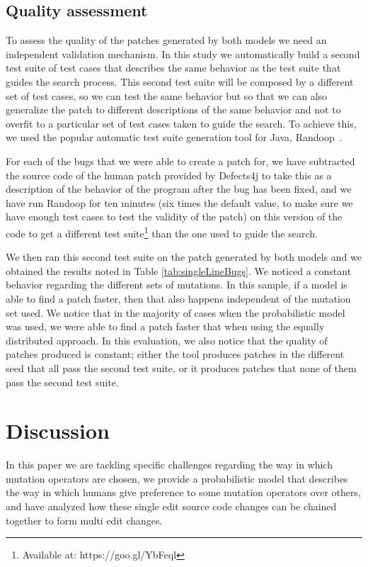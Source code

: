 \documentclass[conference]{IEEEtran}
\begin{document}
\subsection{Quality assessment}
To assess the quality of the patches generated by both models we need an independent validation mechanism. In this study we automatically build a second test suite of test cases that describes the same behavior as the test suite that guides the search process. This second test suite will be composed by a different set of test cases, so we can test the same behavior but so that we can also generalize the patch to different descriptions of the same behavior and not to overfit to a particular set of test cases taken to guide the search. To achieve this, we used the popular automatic test suite generation tool for Java, Randoop~\cite{pacheco07}.

For each of the bugs that we were able to create a patch for, we have subtracted the source code of the human patch provided by Defects4j to take this as a description of the behavior of the program after the bug has been fixed, and we have run Randoop for ten minutes (six times the default value, to make sure we have enough test cases to test the validity of the patch) on this version of the code to get a different test suite\footnote{Available at: https://goo.gl/YbFeql} than the one used to guide the search. 

We then ran this second test suite on the patch generated by both models and we obtained the results noted in Table \ref{tab:singleLineBugs}. We noticed a constant behavior regarding the different sets of mutations. In this sample, if a model is able to find a patch faster, then that also happens independent of the mutation set used. We notice that in the majority of cases when the probabilistic model was used, we were able to find a patch faster that when using the equally distributed approach. In this evaluation, we also notice that the quality of patches produced is constant; either the tool produces patches in the different seed that all pass the second test suite, or it produces patches that none of them pass the second test suite. 




\section{Discussion} \label{discussion}
In this paper we are tackling specific 
challenges regarding the way in which mutation operators are chosen, we provide 
a probabilistic model that describes the way in which humans give preference to 
some mutation operators over others, and have analyzed how these single edit 
source code changes can be chained together to form multi edit changes.
\end{document}
